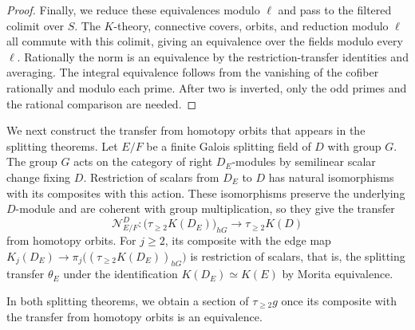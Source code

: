 \begin{proof}
Finally, we reduce these equivalences modulo $\ell$ and pass to the filtered colimit over $S$.
The $K$-theory, connective covers, orbits, and reduction modulo $\ell$ all commute with this colimit, giving an equivalence over the fields modulo every $\ell$.
Rationally the norm is an equivalence by the restriction-transfer identities and averaging.
The integral equivalence follows from the vanishing of the cofiber rationally and modulo each prime.
After two is inverted, only the odd primes and the rational comparison are needed.
\end{proof}

We next construct the transfer from homotopy orbits that appears in the splitting theorems.
Let $E/F$ be a finite Galois splitting field of $D$ with group $G$.
The group $G$ acts on the category of right $D_E$-modules by semilinear scalar change fixing $D$.
Restriction of scalars from $D_E$ to $D$ has natural isomorphisms with its composites with this action.
These isomorphisms preserve the underlying $D$-module and are coherent with group multiplication, so they give the transfer
\[
 \mathcal N^{D}_{E/F}:\bigl(\tau_{\ge2}K(D_E)\bigr)_{hG}\longrightarrow \tau_{\ge2}K(D)
\]
from homotopy orbits.
For $j\ge2$, its composite with the edge map $K_j(D_E)\to\pi_j\bigl((\tau_{\ge2}K(D_E))_{hG}\bigr)$ is restriction of scalars, that is, the splitting transfer $\theta_E$ under the identification $K(D_E)\simeq K(E)$ by Morita equivalence.

In both splitting theorems, we obtain a section of $\tau_{\ge2}g$ once its composite with the transfer from homotopy orbits is an equivalence.

